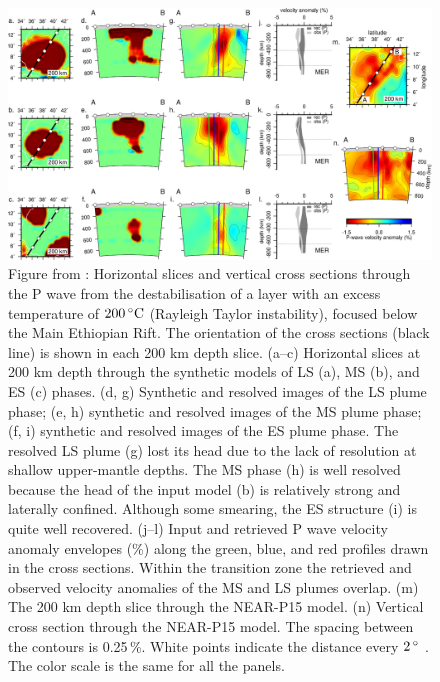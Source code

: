 \begin{figure}
\includegraphics[width=\textwidth]{./figures/ch2-tomography.png}
\caption{Figure from \cite{civiero-etal-2019}: Horizontal slices and vertical cross sections through the P wave from the destabilisation of a layer with an excess temperature of $200\rm\,^{\circ}C$ (Rayleigh Taylor instability), focused below the Main Ethiopian Rift. The orientation of the cross sections (black line) is shown in each 200 km depth slice. (a–c) Horizontal slices at 200 km depth through the synthetic models of LS (a), MS (b), and ES (c) phases. (d, g) Synthetic and resolved images of the LS plume phase; (e, h) synthetic and resolved images of the MS plume phase; (f, i) synthetic and resolved images of the ES plume phase. The resolved LS plume (g) lost its head due to the lack of resolution at shallow upper-mantle depths. The MS phase (h) is well resolved because the head of the input model (b) is relatively strong and laterally confined. Although some smearing, the ES structure (i) is quite well
recovered. (j–l) Input and retrieved P wave velocity anomaly envelopes (\%) along the green, blue, and red profiles drawn in the cross sections. Within the transition zone the retrieved and observed velocity anomalies of the MS and LS plumes overlap. (m) The 200 km depth slice through the NEAR-P15 model. (n)
Vertical cross section through the NEAR-P15 model. The spacing between the contours is 0.25\,\%. White points indicate the distance every $2\rm\,^{\circ}$ . The color scale is the same for all the panels.}
\label{fg:EAR-plumes}
\end{figure}

